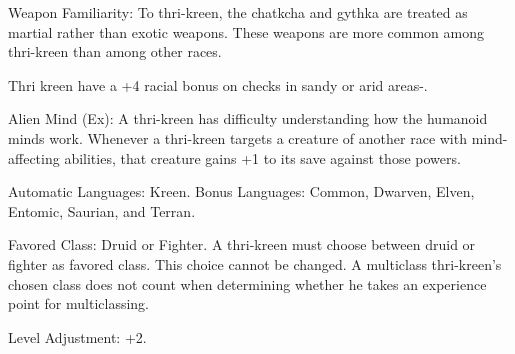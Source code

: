\begin{itemize*}
    \item Weapon Familiarity: To thri-kreen, the chatkcha and gythka are treated as martial rather than exotic weapons. These weapons are more common among thri-kreen than among other races.
    \item Thri kreen have a +4 racial bonus on  checks in sandy or arid areas-.
    \item Alien Mind (Ex): A thri-kreen has difficulty understanding how the humanoid minds work. Whenever a thri-kreen targets a creature of another race with mind-affecting abilities, that creature gains +1 to its save against those powers.
    \item Automatic Languages: Kreen. Bonus Languages: Common, Dwarven, Elven, Entomic, Saurian, and Terran.
    \item Favored Class: Druid or Fighter. A thri-kreen must choose between druid or fighter as favored class. This choice cannot be changed. A multiclass thri-kreen's chosen class does not count when determining whether he takes an experience point for multiclassing.
    \item Level Adjustment: +2.
\end{itemize*}
